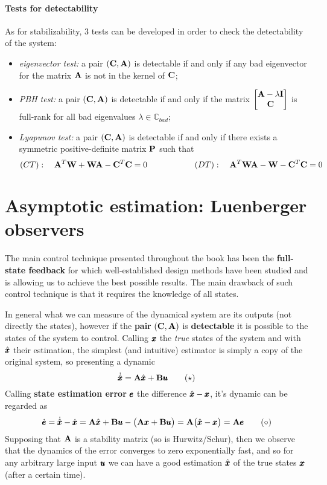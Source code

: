 	\paragraph{Tests for detectability} As for stabilizability, 3 tests can be developed in order to check the detectability of the system:
	\begin{itemize}
		\item \textit{eigenvector test:} a pair $(\C,\A)$ is detectable if and only if any bad eigenvector for the matrix $\A$ is not in the kernel of $\C$;
		\item \textit{PBH test:} a pair $(\C,\A)$ is detectable if and only if the matrix $\matrix{\A-\lambda \I \\ \C}$ is full-rank for all bad eigenvalues $\lambda \in \mathds C_{bad}$;
		\item \textit{Lyapunov test:} a pair $(\C, \A)$ is detectable if and only if there exists a symmetric positive-definite matrix $\P$ such that
		\[ (CT): \quad \A^T \mat W + \mat W \A - \C^T\C = 0 \hspace{2cm} (DT): \quad \A^T\mat W \A - \mat W -\C^T\C = 0 \]
	\end{itemize}
	
\section{Asymptotic estimation: Luenberger observers}	
	The main control technique presented throughout the book has been the \textbf{full-state feedback} for which well-established design methods have been studied and is allowing us to achieve the best possible results. The main drawback of such control technique is that it requires the knowledge of all states.
	
	In general what we can measure of the dynamical system are its outputs (not directly the states), however if the \textbf{pair} $(\C,\A)$ is \textbf{detectable} it is possible to  the states of the system to control. Calling $\x$ the \textit{true} states of the system and with $\hat \x$ their estimation, the simplest (and intuitive) estimator is simply a copy of the original system, so presenting a dynamic
	\[ \dot{\hat\x} = \A\hat \x + \B \u \tag{$\star$} \]
	Calling \textbf{state estimation error} $\vet e$ the difference $\hat \x - \x$, it's dynamic  can be regarded as
	\[ \dot{\vet e} = \dot{\hat\x} - \dx = \A \hat\x + \B \u - \big(\A \x + \B \u\big) = \A \big(\hat \x - \x \big) = \A \vet e \tag{$\circ$} \]
	Supposing that $\A$ is a stability matrix (so is Hurwitz/Schur), then we observe that the dynamics of the error converges to zero exponentially fast, and so for any arbitrary large input $\u$ we can have a good estimation $\hat \x$ of the true states $\x$ (after a certain time).
	
